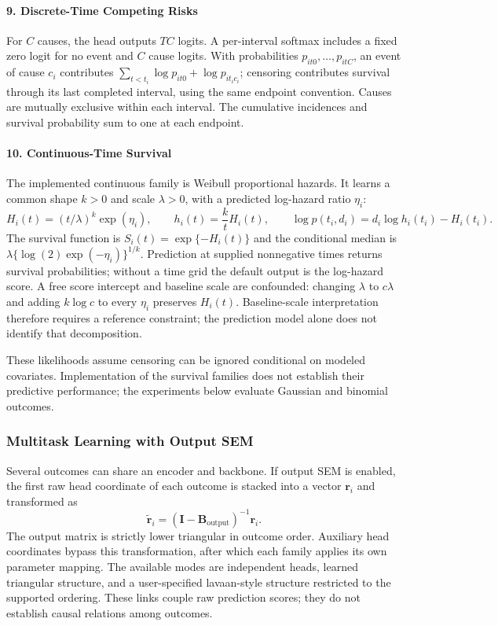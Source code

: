 \documentclass[12pt,a4paper]{article}
\begin{document}
\paragraph{9. Discrete-Time Competing Risks}
For $C$ causes, the head outputs $TC$ logits. A per-interval softmax includes a fixed zero logit for no event and $C$ cause logits. With probabilities $p_{it0},\ldots,p_{itC}$, an event of cause $c_i$ contributes
$\sum_{t<t_i}\log p_{it0}+\log p_{it_i c_i}$; censoring contributes survival through its last completed interval, using the same endpoint convention. Causes are mutually exclusive within each interval. The cumulative incidences and survival probability sum to one at each endpoint.

\paragraph{10. Continuous-Time Survival}
The implemented continuous family is Weibull proportional hazards. It learns a common shape $k>0$ and scale $\lambda>0$, with a predicted log-hazard ratio $\eta_i$:
\begin{equation}
 H_i(t)=(t/\lambda)^k\exp(\eta_i),\qquad
 h_i(t)=\frac{k}{t}H_i(t),\qquad
 \log p(t_i,d_i)=d_i\log h_i(t_i)-H_i(t_i).
\end{equation}
The survival function is $S_i(t)=\exp\{-H_i(t)\}$ and the conditional median is $\lambda\{\log(2)\exp(-\eta_i)\}^{1/k}$. Prediction at supplied nonnegative times returns survival probabilities; without a time grid the default output is the log-hazard score. A free score intercept and baseline scale are confounded: changing $\lambda$ to $c\lambda$ and adding $k\log c$ to every $\eta_i$ preserves $H_i(t)$. Baseline-scale interpretation therefore requires a reference constraint; the prediction model alone does not identify that decomposition.

These likelihoods assume censoring can be ignored conditional on modeled covariates. Implementation of the survival families does not establish their predictive performance; the experiments below evaluate Gaussian and binomial outcomes.

\subsubsection{Multitask Learning with Output SEM}

Several outcomes can share an encoder and backbone. If output SEM is enabled, the first raw head coordinate of each outcome is stacked into a vector $\mathbf r_i$ and transformed as
\begin{equation}
 \widetilde{\mathbf r}_i=(\mathbf I-\mathbf B_{\mathrm{output}})^{-1}\mathbf r_i.
\end{equation}
The output matrix is strictly lower triangular in outcome order. Auxiliary head coordinates bypass this transformation, after which each family applies its own parameter mapping. The available modes are independent heads, learned triangular structure, and a user-specified lavaan-style structure restricted to the supported ordering. These links couple raw prediction scores; they do not establish causal relations among outcomes.
\end{document}
